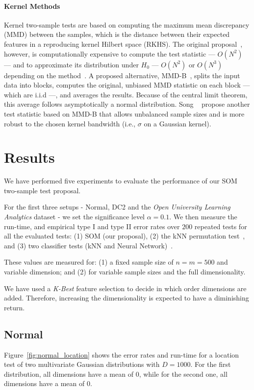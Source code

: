 \paragraph{Kernel Methods}
Kernel two-sample tests are based on computing the maximum mean discrepancy (MMD) between the samples,
which is the distance between their expected features in a reproducing kernel Hilbert space (RKHS).
The original proposal~\cite{gretton2012kernel}, however, is computationally
expensive to compute the test statistic --- $O(N^2)$ --- and to approximate its distribution under
$H_0$ --- $O(N^2)$ or $O(N^3)$ depending on the method~\cite{zaremba2013b}.
A proposed alternative, MMD-B~\cite{zaremba2013b}, splits the input data into blocks, computes the original,
unbiased MMD statistic on each block --- which are i.i.d ---, and averages the results.
Because of the central limit theorem, this average follows asymptotically a normal distribution.
Song \etal~\cite{song2021fast} propose another test statistic based on MMD-B that allows
unbalanced sample sizes and is more robust to the chosen kernel bandwidth (i.e., $\sigma$ on a Gaussian kernel).

\section{Results}
\label{sec:som_results}

We have performed five experiments to evaluate the performance of our \gls{SOM} 
two-sample test proposal.

For the first three setups - Normal, DC2 and the \emph{Open University Learning Analytics} dataset
- we set the significance level $\alpha = 0.1$. We then measure the run-time, and empirical 
type I and type II error rates over $200$ repeated tests for all the evaluated
tests: (1) \gls{SOM}  (our proposal), (2) the kNN permutation test~\cite{Schilling1986b},
and (3) two classifier tests (kNN and Neural Network)~\cite{lopez2016revisiting}.

These values are measured for: (1) a fixed sample size of $n = m = 500$ and variable dimension;
and (2) for variable sample sizes and the full dimensionality.

We have used a \emph{K-Best} feature selection to decide in which order dimensions are added.
Therefore, increasing the dimensionality is expected to have a diminishing return.

\subsection{Normal}
Figure~\ref{fig:normal_location} shows the error rates and run-time for a location
test of two multivariate Gaussian distributions with $D=1000$. For the first distribution,
all dimensions have a mean of $0$, while for the second one, all dimensions have a mean of $0$.


